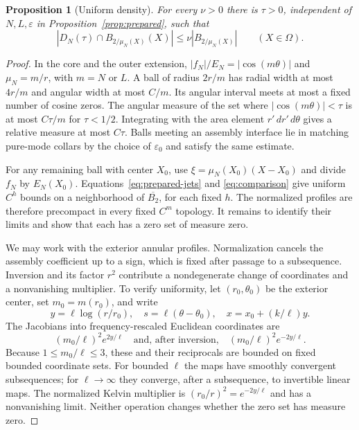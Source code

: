 \documentclass[11pt,twoside,leqno]{article}
\numberwithin{equation}{section}
\newtheorem{proposition}[theorem]{Proposition}
\theoremstyle{definition}
\theoremstyle{remark}
\newcommand{\eps}{\varepsilon}
\newcommand{\Om}{\Omega}
\begin{document}
\begin{proposition}[Uniform density]\label{prop:density}
For every $\nu>0$ there is $\tau>0$, independent of $N,L,\eps$ in
Proposition~\ref{prop:prepared}, such that
\begin{equation}\label{eq:density}
 |D_N(\tau)\cap B_{2/\mu_N(X)}(X)|
 \le\nu|B_{2/\mu_N(X)}|\qquad(X\in\Om).
\end{equation}
\end{proposition}
\begin{proof}
In the core and the outer extension,
$|f_N|/E_N=|\cos(m\theta)|$ and $\mu_N=m/r$, with $m=N$ or $L$.
A ball of radius $2r/m$ has radial width at most $4r/m$ and angular
width at most $C/m$. Its angular interval meets at most a fixed number of cosine zeros.
The angular measure of the set where $|\cos(m\theta)|<\tau$ is at
most $C\tau/m$ for $\tau<1/2$. Integrating with the area element
$r'\,dr'\,d\theta$ gives a relative measure at most $C\tau$.
Balls meeting an assembly interface lie in matching pure-mode collars
by the choice of $\eps_0$ and satisfy the same estimate.

For any remaining ball with center $X_0$, use
$\xi=\mu_N(X_0)(X-X_0)$ and divide $f_N$ by $E_N(X_0)$.
Equations~\eqref{eq:prepared-jets} and \eqref{eq:comparison} give
uniform $C^h$ bounds on a neighborhood of $\overline{B_2}$, for each
fixed $h$. The normalized profiles are therefore precompact in every fixed
$C^m$ topology. It remains to identify their limits and show that
each has a zero set of measure zero.

We may work with the exterior annular profiles. Normalization cancels
the assembly coefficient up to a sign, which is fixed after passage
to a subsequence. Inversion and its factor $r^2$ contribute a
nondegenerate change of coordinates and a nonvanishing multiplier.
To verify uniformity, let $(r_0,\theta_0)$ be the exterior center,
set $m_0=m(r_0)$, and write
\begin{equation}\label{eq:local-coordinates}
 y=\ell\log(r/r_0),\quad s=\ell(\theta-\theta_0),\quad
 x=x_0+(k/\ell)y.
\end{equation}
The Jacobians into frequency-rescaled Euclidean coordinates are
\begin{equation}\label{eq:Jacobian}
 (m_0/\ell)^2e^{2y/\ell}
 \quad\text{and, after inversion,}\quad
 (m_0/\ell)^2e^{-2y/\ell}.
\end{equation}
Because $1\le m_0/\ell\le3$, these and their reciprocals are bounded
on fixed bounded coordinate sets. For bounded $\ell$ the maps have
smoothly convergent subsequences; for $\ell\to\infty$ they converge,
after a subsequence, to invertible linear maps. The normalized Kelvin multiplier is
$(r_0/r)^2=e^{-2y/\ell}$ and has a nonvanishing limit.
Neither operation changes whether the zero set has measure zero.


\end{proof}
\end{document}
